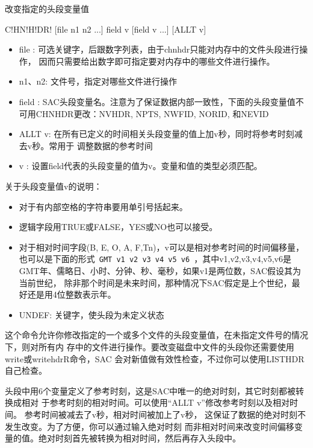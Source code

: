 \label{cmd:chnhdr}

改变指定的头段变量值

\begin{SACSTX}
C!HN!H!DR! [file n1 n2 ...] field v [field v ...] [ALLT v]
\end{SACSTX}

\begin{itemize}
\item file : 可选关键字，后跟数字列表，由于chnhdr只能对内存中的文件头段进行操作，
    因而只需要给出数字即可指定要对内存中的哪些文件进行操作。
\item n1、n2: 文件号，指定对哪些文件进行操作
\item field : SAC头段变量名。注意为了保证数据内部一致性，下面的头段变量值不可用CHNHDR更改：NVHDR, NPTS, NWFID, NORID, 和NEVID
\item ALLT v: 在所有已定义的时间相关头段变量的值上加v秒，同时将参考时刻减去v秒。常用于
    调整数据的参考时间
\item v : 设置field代表的头段变量的值为v。变量和值的类型必须匹配。
\end{itemize}

关于头段变量值v的说明：
\begin{itemize}
\item 对于有内部空格的字符串要用单引号括起来。
\item 逻辑字段用TRUE或FALSE，YES或NO也可以接受。
\item 对于相对时间字段(B, E, O, A, F,Tn)，v可以是相对参考时间的时间偏移量，
    也可以是下面的形式~\lstinline{GMT v1 v2 v3 v4 v5 v6}~，其中v1,v2,v3,v4,v5,v6是
    GMT年、儒略日、小时、分钟、秒、毫秒，如果v1是两位数，SAC假设其为当前世纪，
    除非那个时间是未来时间，那种情况下SAC假定是上个世纪，最好还是用4位整数表示年。
\item UNDEF: 关键字，使头段为未定义状态
\end{itemize}

这个命令允许你修改指定的一个或多个文件的头段变量值，在未指定文件号的情况下，则对所有内
存中的文件进行操作。要改变磁盘中文件的头段你还需要使用write或writehdrR命令，SAC
会对新值做有效性检查，不过你可以使用LISTHDR自己检查。

头段中用6个变量定义了参考时刻，这是SAC中唯一的绝对时刻，其它时刻都被转换成相对
于参考时刻的相对时间。可以使用``ALLT v''修改参考时刻以及相对时间。
参考时间被减去了v秒，相对时间被加上了v秒，
这保证了数据的绝对时刻不发生改变。为了方便，你可以通过输入绝对时刻
而非相对时间来改变时间偏移变量的值。绝对时刻首先被转换为相对时间，然后再存入头段中。

